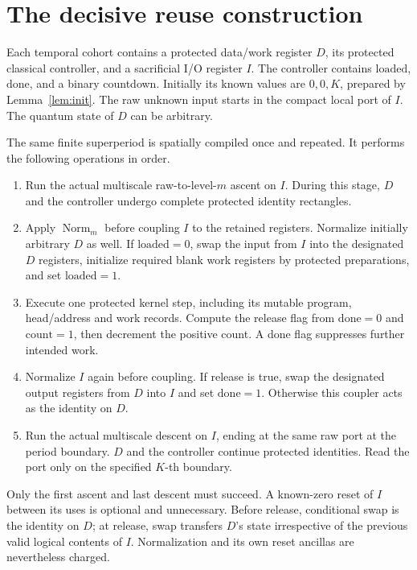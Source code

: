 \documentclass[11pt]{article}
\newcommand{\Norm}{\operatorname{Norm}}
\begin{document}
\section{The decisive reuse construction}

Each temporal cohort contains a protected data/work register $D$, its
protected classical controller, and a sacrificial I/O register $I$.
The controller contains $\mathrm{loaded}$, $\mathrm{done}$, and a binary
countdown. Initially its known values are $0,0,K$, prepared by
Lemma~\ref{lem:init}. The raw unknown input starts in the compact local
port of $I$. The quantum state of $D$ can be arbitrary.

The same finite superperiod is spatially compiled once and repeated.
It performs the following operations in order.
\begin{enumerate}
\item Run the actual multiscale raw-to-level-$m$ ascent on $I$. During
this stage, $D$ and the controller undergo complete protected identity
rectangles.
\item Apply $\Norm_m$ before coupling $I$ to the retained registers.
Normalize initially arbitrary $D$ as well. If
$\mathrm{loaded}=0$, swap the input from $I$ into the designated $D$
registers, initialize required blank work registers by protected
preparations, and set $\mathrm{loaded}=1$.
\item Execute one protected kernel step, including its mutable program,
head/address and work records. Compute the release flag from
$\mathrm{done}=0$ and $\mathrm{count}=1$, then decrement the positive
count. A done flag suppresses further intended work.
\item Normalize $I$ again before coupling. If release is true, swap the
designated output registers from $D$ into $I$ and set $\mathrm{done}=1$.
Otherwise this coupler acts as the identity on $D$.
\item Run the actual multiscale descent on $I$, ending at the same raw
port at the period boundary. $D$ and the controller continue protected
identities. Read the port only on the specified $K$-th boundary.
\end{enumerate}

Only the first ascent and last descent must succeed. A known-zero reset
of $I$ between its uses is optional and unnecessary. Before release,
conditional swap is the identity on $D$; at release, swap transfers $D$'s
state irrespective of the previous valid logical contents of $I$.
Normalization and its own reset ancillas are nevertheless charged.
\end{document}
